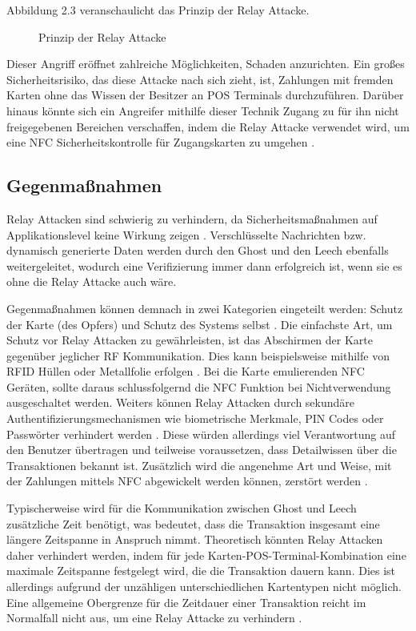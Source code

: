Abbildung 2.3 veranschaulicht das Prinzip der Relay Attacke. 

\begin{figure}[h]
	\caption{Prinzip der Relay Attacke}
\end{figure}

Dieser Angriff eröffnet zahlreiche Möglichkeiten, Schaden anzurichten. Ein großes Sicherheitsrisiko, das diese Attacke nach sich zieht, ist, Zahlungen mit fremden Karten ohne das Wissen der Besitzer an POS Terminals durchzuführen. Darüber hinaus  könnte sich ein Angreifer mithilfe dieser Technik Zugang zu für ihn nicht freigegebenen Bereichen verschaffen, indem die Relay Attacke verwendet wird, um eine NFC Sicherheitskontrolle für Zugangskarten zu umgehen \cite{pickingVirtualPockets}.

\subsection{Gegenmaßnahmen}

Relay Attacken sind schwierig zu verhindern, da Sicherheitsmaßnahmen auf Applikationslevel keine Wirkung zeigen \cite{nfcRelayWithOffTheShelfHardAndSoftware}. Verschlüsselte Nachrichten bzw. dynamisch generierte Daten werden durch den Ghost und den Leech ebenfalls weitergeleitet, wodurch eine Verifizierung immer dann erfolgreich ist, wenn sie es ohne die Relay Attacke auch wäre.

Gegenmaßnahmen können demnach in zwei Kategorien eingeteilt werden: Schutz der Karte (des Opfers) und Schutz des Systems selbst \cite{nfcRelayWithOffTheShelfHardAndSoftware}. Die einfachste Art, um Schutz vor Relay Attacken zu gewährleisten, ist das Abschirmen der Karte gegenüber jeglicher RF Kommunikation. Dies kann beispielsweise mithilfe von RFID Hüllen oder Metallfolie erfolgen \cite{nfcRelayWithOffTheShelfHardAndSoftware}. Bei die Karte emulierenden NFC Geräten, sollte daraus schlussfolgernd die NFC Funktion bei Nichtverwendung ausgeschaltet werden.
Weiters können Relay Attacken durch sekundäre Authentifizierungsmechanismen wie biometrische Merkmale, PIN Codes oder Passwörter verhindert werden \cite{nfcRelayWithOffTheShelfHardAndSoftware}. Diese würden allerdings viel Verantwortung auf den Benutzer übertragen und teilweise voraussetzen, dass Detailwissen über die Transaktionen bekannt ist. Zusätzlich wird die angenehme Art und Weise, mit der Zahlungen mittels NFC abgewickelt werden können, zerstört werden \cite{practicalNfcPeerToPeerRelayMobilePhones}. 

Typischerweise wird für die Kommunikation zwischen Ghost und Leech zusätzliche Zeit benötigt, was bedeutet, dass die Transaktion insgesamt eine längere Zeitspanne in Anspruch nimmt. Theoretisch könnten Relay Attacken daher verhindert werden, indem für jede Karten-POS-Terminal-Kombination eine maximale Zeitspanne festgelegt wird, die die Transaktion dauern kann. Dies ist allerdings aufgrund der unzähligen unterschiedlichen Kartentypen nicht möglich. Eine allgemeine Obergrenze für die Zeitdauer einer Transaktion reicht im Normalfall nicht aus, um eine Relay Attacke zu verhindern \cite{nfcRelayWithOffTheShelfHardAndSoftware}. 

